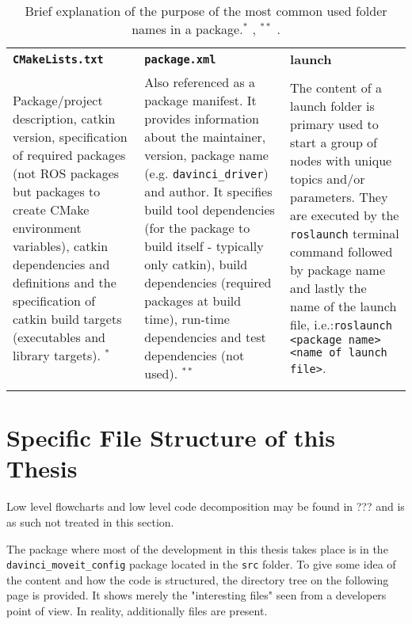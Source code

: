 \begin{table}[H]
\begin{tabularx}{\textwidth}{X X X}
\rowcolor{HeaderBlue} 
 \textbf{\texttt{CMakeLists.txt}} & \textbf{\texttt{package.xml}}& \textbf{launch} \\
Package/project description, \gls{catkin} version, specification of required packages (not ROS packages but packages to create CMake environment variables), catkin dependencies and definitions and the specification of catkin build targets (executables and library targets). 
$^*$  & Also referenced as a package manifest. It provides information about the maintainer, version, package name (e.g. \texttt{davinci\_driver}) and author. It specifies build tool dependencies (for the package to build itself - typically only catkin), build dependencies (required packages at build time), run-time dependencies and test dependencies (not used).  $^{**}$ & The content of a launch folder is primary used to start a group of nodes with unique topics and/or parameters. They are executed by the \texttt{roslaunch} terminal command followed by package name and lastly the name of the launch file, i.e.:\newline \texttt{roslaunch <package name> <name of launch file>}. \\  \rowcolor{textBlue}
\end{tabularx}
	\caption{Brief explanation of the purpose of the most common used folder names in a package.\newline $^*$ \citep{bib:CmakeLists}, $^{**}$ \citep{bib:package}.} 
\label{tab:eleb}
\end{table}
\section{Specific File Structure of this Thesis}
Low level flowcharts and low level code decomposition may be found in ??? and is as such not treated in this section.

The package where most of the development in this thesis takes place is in the \texttt{davinci\_moveit\_config} package located in the \texttt{src} folder. To give some idea of the content and how the code is structured, the directory tree on the following page is provided. It shows merely the "interesting files" seen from a developers point of view. In reality, additionally files are present. 
\newpage
\renewcommand*\DTstylecomment{\rmfamily\color{gray}\textsc}
\renewcommand*\DTstyle{\ttfamily\textcolor{blue}}

